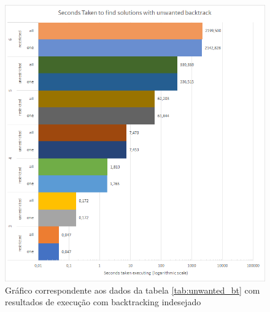 \begin{figure}[ht]
\centering
\includegraphics[width=\textwidth]{figuras/graphs/unwanted_bt.png}
\caption{Gráfico correspondente aos dados da tabela \ref{tab:unwanted_bt} com resultados de execução com backtracking indesejado}
\label{gph:without_unwanted_bt}
\end{figure}